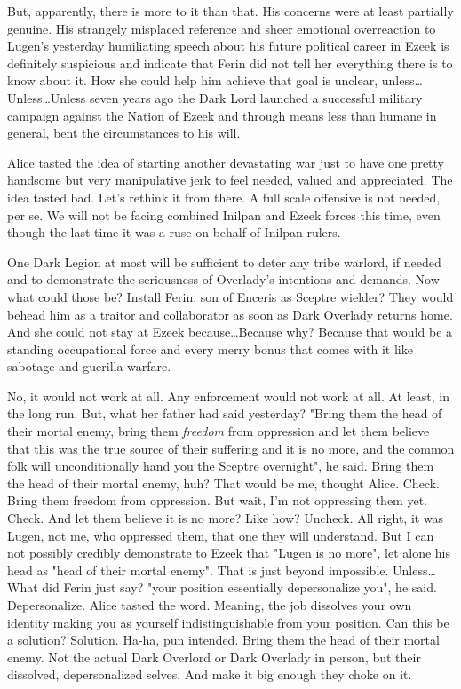 But, apparently, there is more to it than that. His concerns were at least partially genuine. His strangely misplaced reference and sheer emotional overreaction to Lugen's yesterday humiliating speech about his future political career in Ezeek is definitely suspicious and indicate that Ferin did not tell her everything there is to know about it. How she could help him achieve that goal is unclear, unless\dots Unless\dots Unless seven years ago the Dark Lord launched a successful military campaign against the Nation of Ezeek and through means less than humane in general, bent the circumstances to his will.

Alice tasted the idea of starting another devastating war just to have one pretty handsome but very manipulative jerk to feel needed, valued and appreciated. The idea tasted bad. Let's rethink it from there. A full scale offensive is not needed, per se. We will not be facing combined Inilpan and Ezeek forces this time, even though the last time it was a ruse on behalf of Inilpan rulers.

One Dark Legion at most will be sufficient to deter any tribe warlord, if needed and to demonstrate the seriousness of Overlady's intentions and demands. Now what could those be? Install Ferin, son of Enceris as Sceptre wielder? They would behead him as a traitor and collaborator as soon as Dark Overlady returns home. And she could not stay at Ezeek because\dots Because why? Because that would be a standing occupational force and every merry bonus that comes with it like sabotage and guerilla warfare.

No, it would not work at all. Any enforcement would not work at all. At least, in the long run. But, what her father had said yesterday? "Bring them the head of their mortal enemy, bring them \textit{freedom} from oppression and let them believe that this was the true source of their suffering and it is no more, and the common folk will unconditionally hand you the Sceptre overnight", he said. Bring them the head of their mortal enemy, huh? That would be me, thought Alice. Check. Bring them freedom from oppression. But wait, I'm not oppressing them yet. Check. And let them believe it is no more? Like how? Uncheck. All right, it was Lugen, not me, who oppressed them, that one they will understand. But I can not possibly credibly demonstrate to Ezeek that "Lugen is no more", let alone his head as "head of their mortal enemy". That is just beyond impossible. Unless\dots What did Ferin just say? "your position essentially depersonalize you", he said. Depersonalize. Alice tasted the word. Meaning, the job dissolves your own identity making you as yourself indistinguishable from your position. Can this be a solution? Solution. Ha-ha, pun intended. Bring them the head of their mortal enemy. Not the actual Dark Overlord or Dark Overlady in person, but their dissolved, depersonalized selves. And make it big enough they choke on it. 

